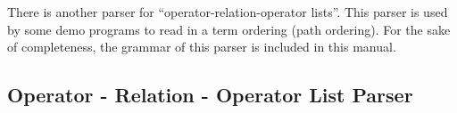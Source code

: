 \vspace{2em}

There is another parser for ``operator-relation-operator lists''. This parser is
used by some demo programs to read in a term ordering (path ordering). For the sake of
completeness, the grammar of this parser is included in this manual.

\subsection{Operator - Relation - Operator List Parser}
\begin{center}
\end{center}
\vspace{1em}